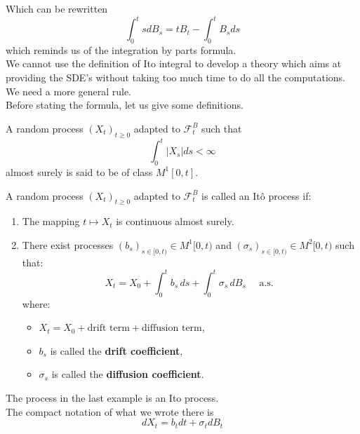 Which can be rewritten
\begin{equation*}
    \int_0^t s dB_s = tB_t - \int_0^t B_s ds
\end{equation*}
which reminds us of the integration by parts formula. \\
We cannot use the definition of Ito integral to develop a theory which aims at providing the SDE's without taking too much time to do all the computations. We need a more general rule. \\
Before stating the formula, let us give some definitions.
\begin{DefBox}
    \begin{Def}
    A random process $(X_t)_{t \geq 0}$ adapted to $\mathcal{F}_t^B$ such that 
    \begin{equation*}
        \int_0^t |X_s| ds < \infty
    \end{equation*}
    almost surely is said to be of class $M^1[0,t]$.
\end{Def}
\end{DefBox}
\begin{DefBox}
    \begin{Def}
    A random process \( (X_t)_{t \geq 0} \) adapted to $\mathcal{F}_t^B$ is called an Itô process if:
\begin{enumerate}
    \item The mapping \( t \mapsto X_t \) is continuous almost surely.
    \item There exist processes \( (b_s)_{s \in [0, t)} \in M^1{[0,t)} \) and \( (\sigma_s)_{s \in [0, t)} \in M^2{[0,t)} \) such that:
    \[
    X_t = X_0 + \int_0^t b_s \, ds + \int_0^t \sigma_s \, dB_s \quad \text{ a.s. }
    \]
    where:
    \begin{itemize}
        \item \( X_t = X_0 + \text{drift term} + \text{diffusion term} \),
        \item \( b_s \) is called the \textbf{drift coefficient},
        \item \( \sigma_s \) is called the \textbf{diffusion coefficient}.
    \end{itemize}
\end{enumerate}
\end{Def}
\end{DefBox}
The process in the last example is an Ito process. \\
The compact notation of what we wrote there is 
\begin{equation*}
    dX_t = b_t dt + \sigma_t dB_t 
\end{equation*}

